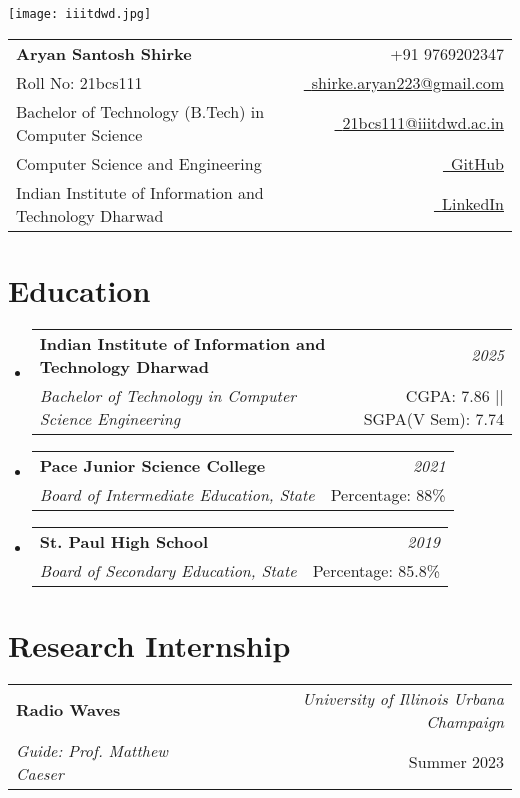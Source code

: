 \documentclass[a4paper,11pt]{article}
\makeatletter
\newcommand{\resumeSubheading}[4]{
\vspace{0.5mm}\item
    \begin{tabular*}{0.98\textwidth}[t]{l@{\extracolsep{\fill}}r}
        \textbf{#1} & \textit{\footnotesize{#4}} \\
        \textit{\footnotesize{#3}} &  \footnotesize{#2}\\
    \end{tabular*}
    \vspace{-2.4mm}
}
\newcommand{\resumeProject}[4]{
\vspace{0.5mm}\item
    \begin{tabular*}{0.98\textwidth}[t]{l@{\extracolsep{\fill}}r}
        \textbf{#1} & \textit{\footnotesize{#3}} \\
        \footnotesize{\textit{#2}} & \footnotesize{#4}
    \end{tabular*}
    \vspace{-2.4mm}
}
\newcommand{\resumeSubHeadingListStart}{\begin{itemize}[leftmargin=*,labelsep=0mm]}
\newcommand{\resumeSubHeadingListEnd}{\end{itemize}\vspace{2mm}}
\newcommand{\name}{Aryan Santosh Shirke} %
\newcommand{\course}{Bachelor of Technology (B.Tech) in Computer Science} %
\newcommand{\phone}{9769202347} %
\newcommand{\emaila}{shirke.aryan223@gmail.com} %
\newcommand{\emailb}{21bcs111@iiitdwd.ac.in} %
\makeatother
\begin{document}
\selectfont


\parbox{2.35cm}{%
\texttt{[image: iiitdwd.jpg]}
}
\parbox{\dimexpr\linewidth-2.8cm\relax}{
\begin{tabularx}{\linewidth}{L r} \\
  \textbf{\Large \name} & {\raisebox{0.0\height}{\footnotesize \faPhone}\ +91 \phone}\\
  {Roll No: 21bcs111} & \href{mailto:\emaila}{\raisebox{0.0\height}{\footnotesize \faEnvelope}\ {\emaila}} \\
  \course &  \href{mailto:\emailb}{\raisebox{0.0\height}{\footnotesize \faEnvelope}\ {\emailb}}\\
  {Computer Science and Engineering} &  \href{https://github.com/HiBorn4}{\raisebox{0.0\height}{\footnotesize \faGithub}\ {GitHub}} \\
  {Indian Institute of Information and Technology Dharwad} & \href{https://www.linkedin.com/in/aryan-shirke/}{\raisebox{0.0\height}{\footnotesize \faLinkedin}\ {LinkedIn}}
\end{tabularx}
}

\section{\textbf{Education}}
  \resumeSubHeadingListStart
    \resumeSubheading
      { Indian Institute of Information and Technology Dharwad}{CGPA: 7.86 || SGPA(V Sem): 7.74}
      {Bachelor of Technology in Computer Science Engineering}{2025}
    \resumeSubheading
      { Pace Junior Science College}{Percentage: 88\%}
      {Board of Intermediate Education, State}{2021}
    \resumeSubheading
      { St. Paul High School}{Percentage: 85.8\%}
      {Board of Secondary Education, State}{2019}
  \resumeSubHeadingListEnd
\vspace{-5.5mm}
%

\section{\textbf{Research Internship}}

\resumeProject
      { Radio Waves} %
      {Guide: Prof. Matthew Caeser} %
      {University of Illinois Urbana Champaign}
      {Summer 2023}
\end{document}
